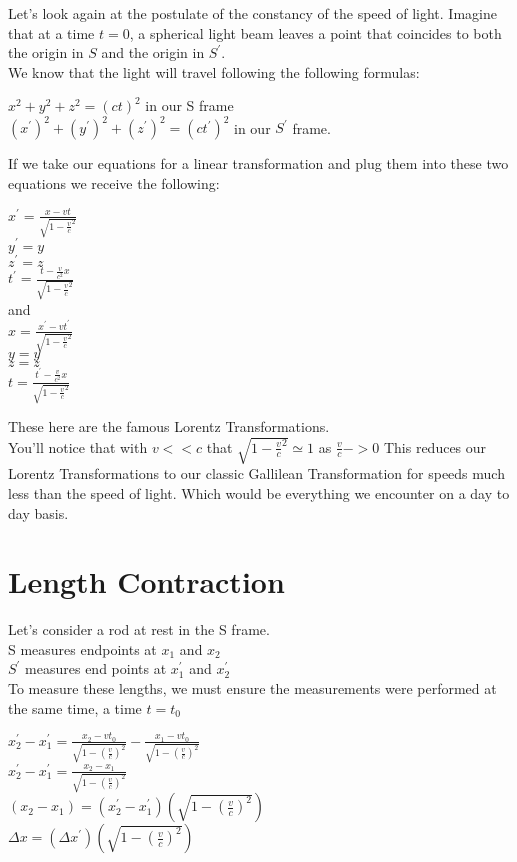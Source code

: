 \documentclass[a4paper]{article}
\begin{document}
Let's look again at the postulate of the constancy of the speed of light. Imagine that at a time $t=0$, a spherical light beam leaves a point that coincides to both the origin in $S$ and the origin in $S^\prime$.\\
We know that the light will travel following the following formulas:
\begin{center}
$x^2 + y^2 + z^2 = (ct)^2$ in our S frame\\
$(x^\prime)^2 + (y^\prime)^2 + (z^\prime)^2 = (ct^\prime)^2$ in our $S^\prime$ frame.
\end{center}
If we take our equations for a linear transformation and plug them into these two equations we receive the following:
\begin{center}
$x^\prime = \frac{x - vt}{\sqrt{1-\frac{v}{c}^2}}$\\
$y^\prime = y$\\
$z^\prime = z$\\
$t^\prime = \frac{t - \frac{v}{c^2}x}{\sqrt{1-\frac{v}{c}^2}}$\\
and\\
$x= \frac{x^\prime - vt^\prime}{\sqrt{1-\frac{v}{c}^2}}$\\
$y= y$\\
$z= z$\\
$t= \frac{t^\prime - \frac{v}{c^2}x}{\sqrt{1-\frac{v}{c}^2}}$\\
\end{center}
These here are the famous Lorentz Transformations.\\
You'll notice that with $v<<c$ that $\sqrt{1-\frac{v}{c}^2} \simeq 1$ as $\frac{v}{c} -> 0$ This reduces our Lorentz Transformations to our classic Gallilean Transformation for speeds much less than the speed of light. Which would be everything we encounter on a day to day basis.

\section{Length Contraction}

Let's consider a rod at rest in the S frame.\\
S measures endpoints at $x_1$ and $x_2$\\
$S^\prime$ measures end points at $x^\prime_1$ and $x^\prime_2$\\
To measure these lengths, we must ensure the measurements were performed at the same time, a time $t=t_0$\\
\begin{center}
$x^\prime_2 - x^\prime_1 = \frac{x_2 - vt_0}{\sqrt{1-(\frac{v}{c})^2}} - \frac{x_1 - vt_0}{\sqrt{1-(\frac{v}{c})^2}}$\\
$x^\prime_2 - x^\prime_1 = \frac{x_2 - x_1}{\sqrt{1-(\frac{v}{c})^2}}$\\
$(x_2 - x_1) = (x^\prime_2 - x^\prime_1) (\sqrt{1-(\frac{v}{c})^2})$\\
$\Delta x = (\Delta x^\prime) (\sqrt{1-(\frac{v}{c})^2})$
\end{center}
\end{document}
